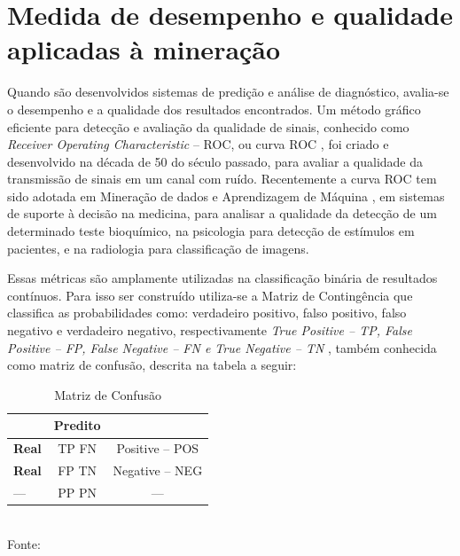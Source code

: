 

\section{Medida de desempenho e qualidade aplicadas à mineração}

Quando são desenvolvidos sistemas de predição e análise de diagnóstico, avalia-se o desempenho e a qualidade dos resultados encontrados.
Um método gráfico eficiente para detecção e avaliação da qualidade de sinais, conhecido como \textit{Receiver Operating Characteristic} -- ROC, ou curva ROC \cite{ROC},
foi criado e desenvolvido na década de 50 do século passado, para avaliar a qualidade da transmissão de sinais em um canal com ruído.
Recentemente a curva ROC tem sido adotada em Mineração de dados e Aprendizagem de Máquina \cite{MD_AM}, em sistemas de suporte à decisão na medicina, para analisar a qualidade da detecção 
de um determinado teste bioquímico, na psicologia para detecção de estímulos \cite{Discriminativo} em pacientes, e na radiologia para classificação de imagens.

Essas métricas são amplamente utilizadas na classificação binária de resultados contínuos. Para isso ser construído utiliza-se a Matriz de Contingência que classifica as probabilidades como:
verdadeiro positivo, falso positivo, falso negativo e verdadeiro negativo, respectivamente \textit{True Positive -- TP, False Positive -- FP, False Negative -- FN e True Negative -- TN },
também conhecida como matriz de confusão, descrita na tabela a seguir:

\begin{table}[ht]
\centering
\caption{Matriz de Confusão}
\vspace{1mm}
\begin{tabular}{l|c|c}
\hline
\textbf{} & \textbf{Predito} & \textbf{}\\
\hline
\textbf{Real}  & TP   FN & Positive -- POS\\
\textbf{Real}  & FP   TN & Negative -- NEG\\
\hline
   ---         & PP   PN &    ---         \\
\end{tabular}
\\
\tiny Fonte: \cite{Bradley1997}
\end{table}

